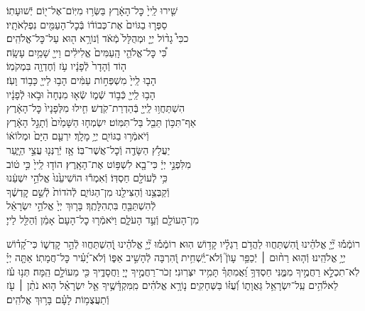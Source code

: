 \documentclass[twoside, openany, parskip=half, 11pt]{book}
\begin{document}
\begin{narrow}
שִׁ֤ירוּ לַֽייָ֙ כׇּל־הָאָ֔רֶץ \hfill בַּשְּׂר֥וּ מִיּֽוֹם־אֶל־י֖וֹם יְֿשׁוּעָתֽוֹ׃\\
סַפְּר֤וּ בַגּוֹיִם֙ אֶת־כְּבוֹד֔וֹ \hfill בְּֿכׇל־הָעַמִּ֖ים נִפְלְאֹתָֽיו׃\\
ככִּי֩ גָד֨וֹל יְיָ֤ וּמְהֻלָּל֙ מְֿאֹ֔ד \hfill וְֿנוֹרָ֥א ה֖וּא עַל־כׇּל־אֱלֹהִֽים׃\\
כִּ֠י כׇּל־אֱלֹהֵ֤י הָֽעַמִּים֙ אֱלִילִ֔ים \hfill וַייָ֖ שָׁמַ֥יִם עָשָֽׂה׃\\
ה֤וֹד וְֿהָדָר֙ לְֿפָנָ֔יו \hfill עֹ֥ז וְֿחֶדְוָ֖ה בִּמְקֹמֽוֹ׃\\
הָב֤וּ לַֽייָ֙ מִשְׁפְּח֣וֹת עַמִּ֔ים \hfill הָב֥וּ לַייָ֖ כָּב֥וֹד וָעֹֽז׃\\
הָב֥וּ לַֽייָ֖ כְּֿב֣וֹד שְֿׁמ֑וֹ \hfill שְֿׂא֤וּ מִנְחָה֙ וּבֹ֣אוּ לְֿפָנָ֔יו\\
הִשְׁתַּחֲו֥וּ לַֽייָ֖ בְּֿהַדְרַת־קֹֽדֶשׁ׃ \hfill חִ֤ילוּ מִלְּפָנָיו֙ כׇּל־הָאָ֔רֶץ\\
אַף־תִּכּ֥וֹן תֵּבֵ֖ל בַּל־תִּמּֽוֹט׃ \hfill יִשְׂמְח֤וּ הַשָּׁמַ֙יִם֙ וְֿתָגֵ֣ל הָאָ֔רֶץ\\
וְֿיֹאמְֿר֥וּ בַגּוֹיִ֖ם יְיָ֥ מָלָֽךְ׃ \hfill יִרְעַ֤ם הַיָּם֙ וּמְלוֹא֔וֹ\\
יַעֲלֹ֥ץ הַשָּׂדֶ֖ה וְֿכׇל־אֲשֶׁר־בּֽוֹ׃ \hfill אָ֥ז יְֿרַנְּנ֖וּ עֲצֵ֣י הַיָּ֑עַר\\
מִלִּפְנֵ֣י יְיָ֔ כִּי־בָ֖א לִשְׁפּ֥וֹט אֶת־הָאָֽרֶץ׃ \hfill הוֹד֤וּ לַֽייָ֙ כִּ֣י ט֔וֹב\\
כִּ֥י לְֿעוֹלָ֖ם חַסְדּֽוֹ׃ \hfill וְֿאִמְר֕וּ הוֹשִׁיעֵ֙נוּ֙ אֱלֹהֵ֣י יִשְׁעֵ֔נוּ\\
וְֿקַבְּצֵ֥נוּ וְֿהַצִּילֵ֖נוּ מִן־הַגּוֹיִ֑ם \hfill לְֿהֹדוֹת֙ לְֿשֵׁ֣ם קׇדְשֶׁ֔ךָ\\
לְֿהִשְׁתַּבֵּ֖חַ בִּתְהִלָּתֶֽךָ׃ \hfill בָּר֤וּךְ יְיָ֙ אֱלֹהֵ֣י יִשְׂרָאֵ֔ל\\
מִן־הָעוֹלָ֖ם וְֿעַ֣ד הָעֹלָ֑ם וַיֹּאמְֿר֤וּ כׇל־הָעָם֙ אָמֵ֔ן \hfill וְֿהַלֵּ֖ל לַייָ׃
\end{narrow}

\newcommand{\negline}{\vspace{-\baselineskip}}

\negline

%
רוֹמְֿמ֡וּ יְ֘יָ֤ אֱלֹהֵ֗ינוּ וְֽֿ֭הִשְׁתַּחֲווּ לַהֲדֹ֥ם רַגְלָ֗יו קָד֥וֹשׁ הֽוּא׃ \hfill \break
רוֹמְֿמ֡וּ יְ֘יָ֤ אֱלֹהֵ֗ינוּ וְֽֿ֭הִשְׁתַּחֲווּ לְֿהַ֣ר קׇדְשׁ֑וֹ כִּי־קָ֝ד֗וֹשׁ יְיָ֥ אֱלֹהֵֽינוּ׃ \hfill \break
{}%
וְֿה֤וּא רַח֨וּם ׀ יְֿכַפֵּ֥ר עָוֺן֮ וְֽֿלֹא־יַֽ֫שְׁחִ֥ית וְֿ֭הִרְבָּה לְֿהָשִׁ֣יב אַפּ֑וֹ \hfill \break
וְֿלֹא־יָ֝עִ֗יר כׇּל־חֲמָתֽוֹ׃ \hfill \break
{}%
אַתָּ֤ה יְיָ֗ לֹֽא־תִכְלָ֣א רַחֲמֶ֣יךָ מִמֶּ֑נִּי חַסְדְּךָ֥ וַ֝אֲמִתְּךָ֗ תָּמִ֥יד יִצְּרֽוּנִי׃ \hfill \break
{}זְכֹר־רַחֲמֶ֣יךָ יְיָ֭ וַחֲסָדֶ֑יךָ כִּ֖י מֵעוֹלָ֣ם הֵֽמָּה׃ \hfill \break
{}תְּנ֥וּ עֹ֗ז לֵאלֹ֫הִ֥ים עַֽל־יִשְׂרָאֵ֥ל גַּאֲוָת֑וֹ וְֿ֝עֻזּ֗וֹ בַּשְּׁחָקִֽים׃ \hfill \break
נ֤וֹרָ֥א אֱלֹהִ֗ים מִֽמִּקְדָּ֫שֶׁ֥יךָ אֵ֤ל יִשְׂרָאֵ֗ל \hfill \break
ה֤וּא נֹתֵ֨ן ׀ עֹ֖ז וְֿתַעֲצֻמ֥וֹת לָעָ֗ם בָּר֥וּךְ אֱלֹהִֽים׃ \hfill \break
\end{document}
